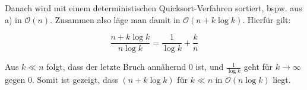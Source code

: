 \documentclass{article}
\begin{document}
\begin{enumerate}[\bfseries1.]
    Danach wird mit einem deterministischen Quicksort-Verfahren sortiert, bspw.
    aus a) in $\mathcal{O}(n)$. Zusammen also läge man damit in $\mathcal{O}(n+k\log k)$.
    Hierfür gilt:

    \[ \frac{n+k \log k}{n \log k} = \frac{1}{\log k} + \frac{k}{n} \]

    Aus $k \ll n$ folgt, dass der letzte Bruch annähernd $0$ ist, und $\frac{1}{\log k}$
    geht für $k \rightarrow \infty$ gegen $0$. Somit ist gezeigt, dass
    $(n+k \log k)$ für $k \ll n$ in $\mathcal{O}(n \log k)$ liegt.


    \end{enumerate}
\end{document}
